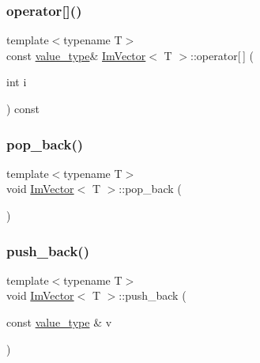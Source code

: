 \mbox{\label{class_im_vector_ab97c3f6f1943602e36afb593c6f03ff1}} 
\subsubsection{\texorpdfstring{operator[]()}{operator[]()}\hspace{0.1cm}{\footnotesize\ttfamily [2/2]}}
{\footnotesize\ttfamily template$<$typename T$>$ \\
const \mbox{\hyperlink{class_im_vector_a8bd77e4e7581d8e5f9e98d7c2f3c2a80}{value\+\_\+type}}\& \mbox{\hyperlink{class_im_vector}{Im\+Vector}}$<$ T $>$\+::operator\mbox{[}$\,$\mbox{]} (\begin{DoxyParamCaption}\item[{int}]{i }\end{DoxyParamCaption}) const\hspace{0.3cm}{\ttfamily [inline]}}

\mbox{\label{class_im_vector_a3db7ce62d3c429effdb893fbf7148c1c}} 
\subsubsection{\texorpdfstring{pop\+\_\+back()}{pop\_back()}}
{\footnotesize\ttfamily template$<$typename T$>$ \\
void \mbox{\hyperlink{class_im_vector}{Im\+Vector}}$<$ T $>$\+::pop\+\_\+back (\begin{DoxyParamCaption}{ }\end{DoxyParamCaption})\hspace{0.3cm}{\ttfamily [inline]}}

\mbox{\label{class_im_vector_a68387993f2a5f5c3b2a7139d9ab778b8}} 
\subsubsection{\texorpdfstring{push\+\_\+back()}{push\_back()}}
{\footnotesize\ttfamily template$<$typename T$>$ \\
void \mbox{\hyperlink{class_im_vector}{Im\+Vector}}$<$ T $>$\+::push\+\_\+back (\begin{DoxyParamCaption}\item[{const \mbox{\hyperlink{class_im_vector_a8bd77e4e7581d8e5f9e98d7c2f3c2a80}{value\+\_\+type}} \&}]{v }\end{DoxyParamCaption})\hspace{0.3cm}{\ttfamily [inline]}}

